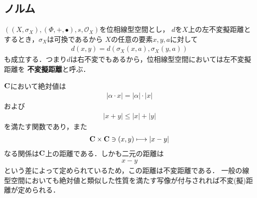 \subsection{ノルム}
	$\left(\left(X,\sigma_X\right),(\Phi,+,\bullet),s,\mathscr{O}_X\right)$を位相線型空間とし，
	$d$を$X$上の左不変擬距離とするとき，$\sigma_X$は可換であるから
	$X$の任意の要素$x,y,a$に対して
	\begin{align}
		d\left(x,y\right) = d\left(\sigma_X\left(x,a\right),\sigma_X\left(y,a\right)\right)
	\end{align}
	も成立する．つまり$d$は右不変でもあるから，位相線型空間においては左不変擬距離を
	{\bf 不変擬距離}と呼ぶ．
	
	$\mathbf{C}$において絶対値は
	\begin{align}
		|\alpha \cdot x| = |\alpha| \cdot |x|
	\end{align}
	および
	\begin{align}
		|x + y| \leq |x| + |y|
	\end{align}
	を満たす関数であり，また
	\begin{align}
		\mathbf{C} \times \mathbf{C} \ni (x,y) \longmapsto |x - y|
	\end{align}
	なる関係は$\mathbf{C}$上の距離である．しかも二元の距離は
	\begin{align}
		x - y
	\end{align}
	という差によって定められているため，この距離は不変距離である．
	一般の線型空間においても絶対値と類似した性質を満たす写像が付与されれば不変(擬)距離が定められる．
	
